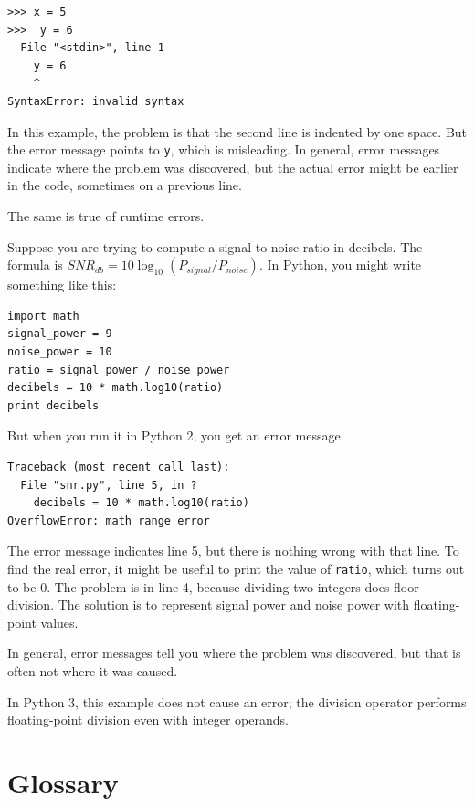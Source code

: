 \documentclass[10pt]{book}
\begin{document}
\begin{CJK}{UTF8}{gbsn}
\begin{verbatim}
>>> x = 5
>>>  y = 6
  File "<stdin>", line 1
    y = 6
    ^
SyntaxError: invalid syntax
\end{verbatim}
%
In this example, the problem is that the second line is indented by
one space.  But the error message points to {\tt y}, which is
misleading.  In general, error messages indicate where the problem was
discovered, but the actual error might be earlier in the code,
sometimes on a previous line.

The same is true of runtime errors.  

Suppose you are trying
to compute a signal-to-noise ratio in decibels.  The formula
is $SNR_{db} = 10 \log_{10} (P_{signal} / P_{noise})$.  In Python,
you might write something like this:

\begin{verbatim}
import math
signal_power = 9
noise_power = 10
ratio = signal_power / noise_power
decibels = 10 * math.log10(ratio)
print decibels
\end{verbatim}
%
But when you run it in Python 2, you get an error message.

\begin{verbatim}
Traceback (most recent call last):
  File "snr.py", line 5, in ?
    decibels = 10 * math.log10(ratio)
OverflowError: math range error
\end{verbatim}
%
The error message indicates line 5, but there is nothing
wrong with that line.  To find the real error, it might be
useful to print the value of {\tt ratio}, which turns out to
be 0.  The problem is in line 4, because dividing two integers
does floor division.  The solution is to represent signal power
and noise power with floating-point values.

In general, error messages tell you where the problem was discovered, 
but that is often not where it was caused.

In Python 3, this example does not cause an error; the division operator
performs floating-point division even with integer operands.


\section{Glossary}

\begin{description}


\end{description}
\end{CJK}
\end{document}
